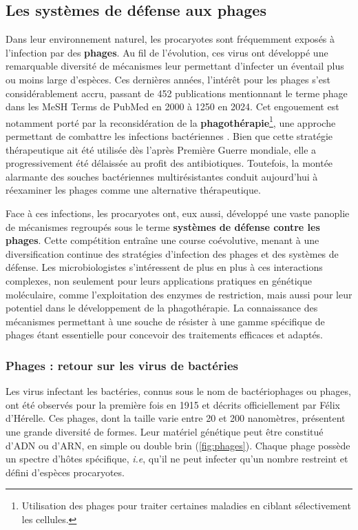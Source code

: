 \newpage

\subsection{Les systèmes de défense aux phages}
\label{sec:def}

Dans leur environnement naturel, les procaryotes sont fréquemment exposés à l’infection par des \textbf{phages}. Au fil de l’évolution, ces virus ont développé une remarquable diversité de mécanismes leur permettant d’infecter un éventail plus ou moins large d’espèces. Ces dernières années, l’intérêt pour les phages s’est considérablement accru, passant de 452 publications mentionnant le terme phage dans les MeSH Terms de PubMed en 2000 à 1250 en 2024. Cet engouement est notamment porté par la reconsidération de la \textbf{phagothérapie}\footnote{Utilisation des phages pour traiter certaines maladies en ciblant sélectivement les cellules.}, une approche permettant de combattre les infections bactériennes \cite{boniver_phage_2022}. Bien que cette stratégie thérapeutique ait été utilisée dès l’après Première Guerre mondiale, elle a progressivement été délaissée au profit des antibiotiques. Toutefois, la montée alarmante des souches bactériennes multirésistantes conduit aujourd’hui à réexaminer les phages comme une alternative thérapeutique.

Face à ces infections, les procaryotes ont, eux aussi, développé une vaste panoplie de mécanismes regroupés sous le terme \textbf{systèmes de défense contre les phages}. Cette compétition entraîne une course coévolutive, menant à une diversification continue des stratégies d’infection des phages et des systèmes de défense. Les microbiologistes s’intéressent de plus en plus à ces interactions complexes, non seulement pour leurs applications pratiques en génétique moléculaire, comme l’exploitation des enzymes de restriction, mais aussi pour leur potentiel dans le développement de la phagothérapie. La connaissance des mécanismes permettant à une souche de résister à une gamme spécifique de phages étant essentielle pour concevoir des traitements efficaces et adaptés.

\subsubsection{Phages : retour sur les virus de bactéries}
\label{sec:phage}
Les virus infectant les bactéries, connus sous le nom de bactériophages ou phages, ont été observés pour la première fois en 1915 et décrits officiellement par Félix d'Hérelle. Ces phages, dont la taille varie entre 20 et 200 nanomètres, présentent une grande diversité de formes. Leur matériel génétique peut être constitué d'ADN ou d'ARN, en simple ou double brin (\autoref{fig:phages}). Chaque phage possède un spectre d'hôtes spécifique, \textit{i.e}, qu'il ne peut infecter qu'un nombre restreint et défini d'espèces procaryotes.

